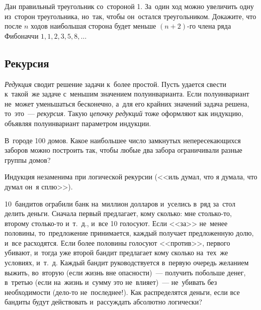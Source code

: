 \begin{problems}

\item
Дан правильный треугольник со~стороной 1.
За~один ход можно увеличить одну из~сторон треугольника, но~так, чтобы
он~остался треугольником.
Докажите, что после $n$ ходов наибольшая сторона будет меньше $(n + 2)$-го
члена ряда Фибоначчи $1, 1, 2, 3, 5, 8, \ldots$

\end{problems}

\subsection*{Рекурсия}

\emph{Редукция} сводит решение задачи к~более простой.
Пусть удается свести к~такой~же задаче с~меньшим значением полуинварианта.
Если полуинвариант не~может уменьшаться бесконечно, а~для его крайних значений
задача решена, то~это~--- \emph{рекурсия.}
Такую \emph{цепочку редукций} тоже оформляют как индукцию, объявляя
полуинвариант параметром индукции.

\begin{problems}

\item
В~городе 100 домов.
Какое наибольшее число замкнутых непересекающихся заборов можно построить так,
чтобы любые два забора ограничивали разные группы домов?

\end{problems}

Индукция незаменима при логической рекурсии
(<<иль думал, что я думала, что думал он~я сплю>>).

\begin{problems}

\item
10~бандитов ограбили банк на~миллион долларов и~уселись в~ряд за~стол делить
деньги.
Сначала первый предлагает, кому сколько: мне столько-то, второму столько-то
и~т.~д., и~все 10 голосуют.
Если <<за>> не~менее половины, то~предложение принимается, каждый получает
предложенную долю, и~все расходятся.
Если более половины голосуют <<против>>, первого убивают, и~тогда уже второй
бандит предлагает кому сколько на~тех~же условиях, и~т.~д.
Каждый бандит руководствуется в~первую очередь желанием выжить, во~вторую
(если жизнь вне опасности)~--- получить побольше денег, в~третью
(если на~жизнь и~сумму это не~влияет)~--- не~убивать без необходимости
(дело-то не~последнее!).
Как распределятся деньги, если все бандиты будут действовать и~рассуждать
абсолютно логически?

\end{problems}


